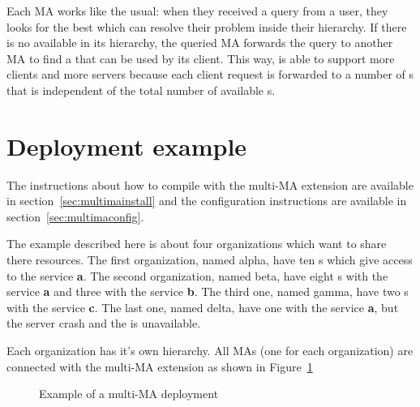 Each MA works like the usual: when they received a query from a user,
they looks for the best \sed which can resolve their problem inside
their hierarchy. If there is no \sed available in its hierarchy, the
queried MA forwards the query to another MA to find a \sed that can be
used by its client. This way, \diet is able to support more clients
and more servers because each client request is forwarded to a number
of {\sed}s that is independent of the total number of available
{\sed}s.

\section{Deployment example}

The instructions about how to compile \diet with the multi-MA
extension are available in section~\ref{sec:multimainstall} and the
configuration instructions are available in
section~\ref{sec:multimaconfig}.

The example described here is about four organizations which want to
share there resources. The first organization, named alpha, have ten
{\sed}s which give access to the service \textbf{a}. The second
organization, named beta, have eight {\sed}s with the service
\textbf{a} and three with the service \textbf{b}. The third one, named
gamma, have two {\sed}s with the service \textbf{c}.  The last one,
named delta, have one \sed with the service \textbf{a}, but the server
crash and the \sed is unavailable.

Each organization has it's own \diet hierarchy. All MAs (one for each
organization) are connected with the multi-MA extension as shown in
Figure~\ref{fig:multima}


\begin{figure}[h]
 \begin{center}
   \label{fig:multima}
  \caption{Example of a multi-MA deployment}
 \end{center}
\end{figure}

